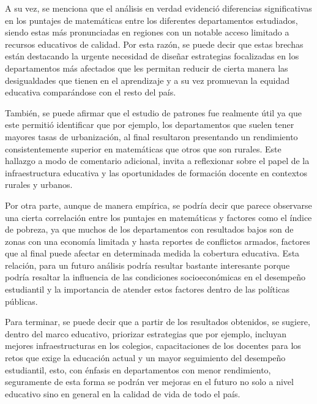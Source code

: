 \documentclass[12pt]{article}
\begin{document}
A su vez, se menciona que el análisis en verdad evidenció diferencias significativas en los puntajes de matemáticas entre los diferentes departamentos estudiados, siendo estas más pronunciadas en regiones con un notable acceso limitado a recursos educativos de calidad. Por esta razón, se puede decir que estas brechas están destacando la urgente necesidad de diseñar estrategias focalizadas en los departamentos más afectados que les permitan reducir de cierta manera las desigualdades que tienen en el aprendizaje y a su vez promuevan la equidad educativa comparándose con el resto del país.

También, se puede afirmar que el estudio de patrones fue realmente útil ya que este permitió identificar que por ejemplo, los departamentos que suelen tener mayores tasas de urbanización, al final resultaron presentando un rendimiento consistentemente superior en matemáticas que otros que son rurales. Este hallazgo a modo de comentario adicional, invita a reflexionar sobre el papel de la infraestructura educativa y las oportunidades de formación docente en contextos rurales y urbanos.

Por otra parte, aunque de manera empírica, se podría decir que parece observarse una cierta correlación entre los puntajes en matemáticas y factores como el índice de pobreza, ya que muchos de los departamentos con resultados bajos son de zonas con una economía limitada y hasta reportes de conflictos armados, factores que al final puede afectar en determinada medida la cobertura educativa. Esta relación, para un futuro análisis podría resultar bastante interesante porque podría resaltar la influencia de las condiciones socioeconómicas en el desempeño estudiantil y la importancia de atender estos factores dentro de las políticas públicas.

Para terminar, se puede decir que a partir de los resultados obtenidos, se sugiere, dentro del marco educativo, priorizar estrategias que por ejemplo, incluyan mejores infraestructuras en los colegios, capacitaciones de los docentes para los retos que exige la educación actual y un mayor seguimiento del desempeño estudiantil, esto, con énfasis en departamentos con menor rendimiento, seguramente de esta forma se podrán ver mejoras en el futuro no solo a nivel educativo sino en general en la calidad de vida de todo el país.
\end{document}
